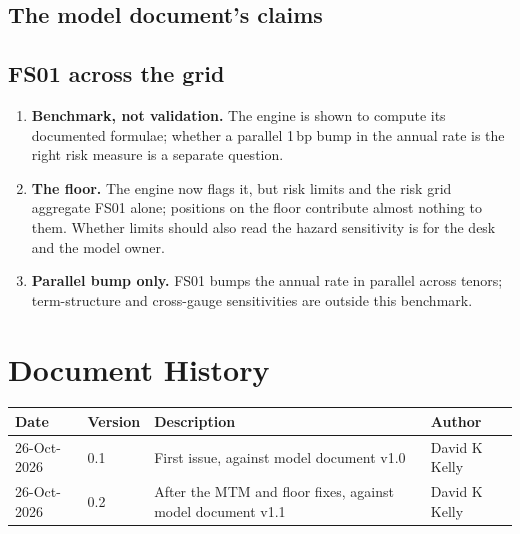 \documentclass[11pt,a4paper]{article}
\renewcommand{\mkmhistorypage}[1]{%
    \section{Document History}
    \begin{table}[ht]
        \centering
        \begin{tabular}{l|l|p{9cm}|l}
            \textbf{Date} & \textbf{Version} & \textbf{Description} & \textbf{Author} \\
            \hline
            #1
        \end{tabular}
    \end{table}
}
\begin{document}


\subsection{The model document's claims}


\subsection{FS01 across the grid}


\mkmlimitations

\begin{enumerate}[leftmargin=*]
\item \textbf{Benchmark, not validation.} The engine is shown to compute its
  documented formulae; whether a parallel 1\,bp bump in the annual rate is the right
  risk measure is a separate question.
\item \textbf{The floor.} The engine now flags it, but risk limits and the risk grid
  aggregate FS01 alone; positions on the floor contribute almost nothing to them.
  Whether limits should also read the hazard sensitivity is for the desk and the
  model owner.
\item \textbf{Parallel bump only.} FS01 bumps the annual rate in parallel across
  tenors; term-structure and cross-gauge sensitivities are outside this benchmark.
\end{enumerate}

\mkmhistorypage{26-Oct-2026 & 0.1 & First issue, against model document v1.0 & David K Kelly \\
26-Oct-2026 & 0.2 & After the MTM and floor fixes, against model document v1.1 & David K Kelly \\}
\end{document}
